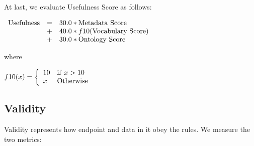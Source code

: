 \documentclass[11pt,a4paper]{article}
\begin{document}
At last, we evaluate Usefulness Score as follows:

\begin{mdframed}
  \center
  $\begin{array}{lll}
  {\rm Usefulness} & = & 30.0 * {\rm Metadata~Score} \\
                   & + & 40.0 * f10({\rm Vocabulary~Score}) \\
                   & + & 30.0 * {\rm Ontology~Score}
  \end{array}$

  where

  $f10(x) = \left\{
    \begin{array}{ll}
      10 & {\rm if}~x>10 \\
      x  & {\rm Otherwise}
    \end{array}
  \right.$
\end{mdframed}

\subsection{Validity}

  Validity represents how endpoint and data in it obey the rules.
  We measure the two metrics:
\end{document}

